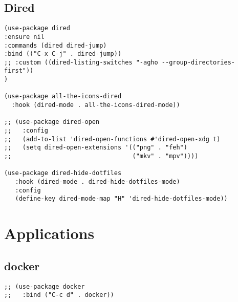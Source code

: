 \documentclass[11pt]{article}
\begin{document}
\subsection*{Dired}
\label{sec:org4112402}
\begin{verbatim}
(use-package dired
:ensure nil
:commands (dired dired-jump)
:bind (("C-x C-j" . dired-jump))
;; :custom ((dired-listing-switches "-agho --group-directories-first"))
)

(use-package all-the-icons-dired
  :hook (dired-mode . all-the-icons-dired-mode))

;; (use-package dired-open
;;   :config
;;   (add-to-list 'dired-open-functions #'dired-open-xdg t)
;;   (setq dired-open-extensions '(("png" . "feh")
;;                                 ("mkv" . "mpv"))))

(use-package dired-hide-dotfiles
   :hook (dired-mode . dired-hide-dotfiles-mode)
   :config 
   (define-key dired-mode-map "H" 'dired-hide-dotfiles-mode))
\end{verbatim}
\section*{Applications}
\label{sec:orga62f602}
\subsection*{docker}
\label{sec:org50fb026}
\begin{verbatim}
;; (use-package docker
;;   :bind ("C-c d" . docker))
\end{verbatim}
\end{document}
